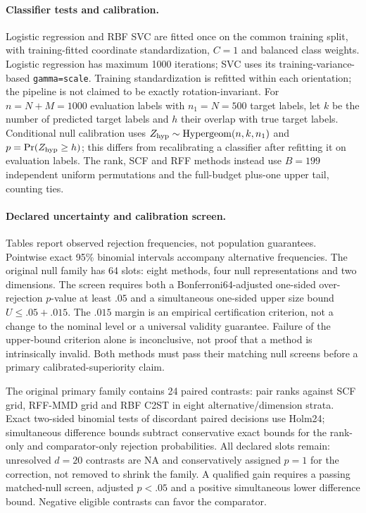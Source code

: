 {\paragraph{Classifier tests and calibration.}
Logistic regression and RBF SVC are fitted once on the common training split,
with training-fitted coordinate standardization, $C=1$ and balanced class
weights. Logistic regression has maximum 1000 iterations; SVC uses its
training-variance-based \texttt{gamma=scale}. Training standardization is
refitted within each orientation; the pipeline is not claimed to be exactly
rotation-invariant. For $n=N+M=1000$ evaluation labels with $n_1=N=500$ target
labels, let $k$ be the number of predicted target labels and $h$ their overlap
with true target labels. Conditional null calibration uses
$Z_{\rm hyp}\sim\mathrm{Hypergeom}(n,k,n_1)$ and $p=\Pr(Z_{\rm hyp}\ge h)$; this differs from recalibrating a classifier after refitting it on evaluation labels.
The rank, SCF and RFF methods instead use $B=199$ independent uniform
permutations and the full-budget plus-one upper tail, counting ties.

\paragraph{Declared uncertainty and calibration screen.}
Tables report observed rejection frequencies, not population guarantees.
Pointwise exact 95\% binomial intervals accompany alternative frequencies.
The original null family has 64 slots: eight methods, four null representations
and two dimensions. The screen requires both a Bonferroni64-adjusted one-sided
over-rejection $p$-value at least $.05$ and a simultaneous one-sided upper size
bound $U\leq .05+.015$. The $.015$ margin is an empirical certification
criterion, not a change to the nominal level or a universal validity guarantee.
Failure of the upper-bound criterion alone is inconclusive, not proof that a
method is intrinsically invalid. Both methods must pass their matching null
screens before a primary calibrated-superiority claim.

The original primary family contains 24 paired contrasts: pair ranks against
SCF grid, RFF-MMD grid and RBF C2ST in eight alternative/dimension strata.
Exact two-sided binomial tests of discordant paired decisions use Holm24;
simultaneous difference bounds subtract conservative exact bounds for the
rank-only and comparator-only rejection probabilities. All declared slots
remain: unresolved $d=20$ contrasts are NA and conservatively assigned $p=1$
for the correction, not removed to shrink the family. A qualified gain requires
a passing matched-null screen, adjusted $p<.05$ and a positive simultaneous
lower difference bound. Negative eligible contrasts can favor the comparator.

}
